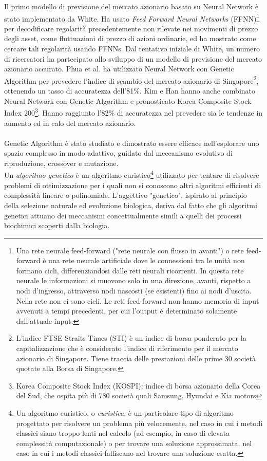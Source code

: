 \documentclass[a4paper,12pt]{report}
\begin{document}
Il primo modello di previsione del mercato azionario basato su Neural Network è stato implementato da White\cite{whitenn}. Ha usato \textit{Feed Forward Neural Networks} (FFNN)\footnote{Una rete neurale feed-forward ("rete neurale con flusso in avanti") o rete feed-forward è una rete neurale artificiale dove le connessioni tra le unità non formano cicli, differenziandosi dalle reti neurali ricorrenti. In questa rete neurale le informazioni si muovono solo in una direzione, avanti, rispetto a nodi d'ingresso, attraverso nodi nascosti (se esistenti) fino ai nodi d'uscita. Nella rete non ci sono cicli. Le reti feed-forward non hanno memoria di input avvenuti a tempi precedenti, per cui l'output è determinato solamente dall'attuale input. } per decodificare regolarità precedentemente non rilevate nei movimenti di prezzo degli asset, come fluttuazioni di prezzo di azioni ordinarie, ed ha mostrato come cercare tali regolarità usando FFNNs. Dal tentativo iniziale di White, un numero di ricercatori ha partecipato allo sviluppo di un modello di previsione del mercato azionario accurato. Phua et al. \cite{puann} ha utilizzato Neural Network con Genetic Algorithm per prevedere l'indice di scambio del mercato azionario di Singapore\footnote{L'indice FTSE Straits Times (STI) è un indice di borsa ponderato per la capitalizzazione che è considerato l'indice di riferimento per il mercato azionario di Singapore. Tiene traccia delle prestazioni delle prime 30 società quotate alla Borsa di Singapore.}, ottenendo un tasso di accuratezza dell'81\%. Kim e Han \cite{kimnn} hanno anche combinato Neural Network con Genetic Algorithm e pronosticato Korea Composite Stock Index 200\footnote{Korea Composite Stock Index (KOSPI): indice di borsa azionario della Corea del Sud, che ospita più di 780 società quali Samsung, Hyundai e Kia motors}. Hanno raggiunto l'82\% di accuratezza nel prevedere sia le tendenze in aumento ed in calo del mercato azionario.\\~\\
Genetic Algorithm è stato studiato e dimostrato essere efficace nell'esplorare uno spazio complesso in modo adattivo, guidato dal meccanismo evolutivo di riproduzione, crossover e mutazione.\\
Un \textit{algoritmo genetico} è un algoritmo euristico\footnote{Un algoritmo euristico, o \textit{euristica}, è un particolare tipo di algoritmo progettato per risolvere un problema più velocemente, nel caso in cui i metodi classici siano troppo lenti nel calcolo (ad esempio, in caso di elevata complessità computazionale) o per trovare una soluzione approssimata, nel caso in cui i metodi classici falliscano nel trovare una soluzione esatta.} utilizzato per tentare di risolvere problemi di ottimizzazione per i quali non si conoscono altri algoritmi efficienti di complessità lineare o polinomiale. L'aggettivo "genetico", ispirato al principio della selezione naturale ed evoluzione biologica, deriva dal fatto che gli algoritmi genetici attuano dei meccanismi concettualmente simili a quelli dei processi biochimici scoperti dalla biologia.\\
\end{document}

